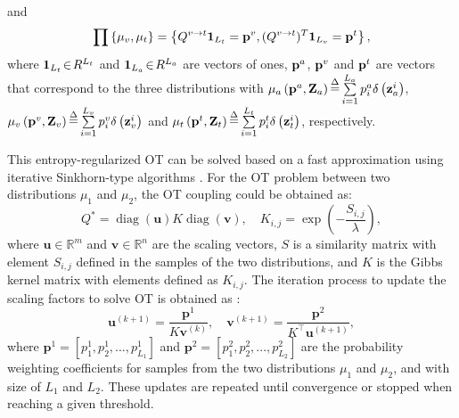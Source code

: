 \documentclass[conference]{IEEEtran}
\begin{document}
and
\begin{equation}
	\prod {\left\{ {\mu_v ,\mu_t } \right\}} = \left\{ {Q^{v \to t} {\bf 1}_{L_t }  = \mathbf{p}^v ,(Q^{v \to t} )^T {\bf 1}_{L_v }  = \mathbf{p}^t } \right\},
\end{equation}  
where ${\bf 1}_{L_t } \! \in \! R^{L_t }$ and ${\bf 1}_{L_a } \!\in \! R^{L_a }$ are vectors of ones, ${\bf p}^a$, ${\bf p}^v$ and ${\bf p}^t$ are vectors that correspond to the three distributions with $\mu _a \left( {{\bf p}^a ,{\bf Z}_a } \right) \mathop  = \limits^\Delta \sum\limits_{i = 1}^{L_a } {p_i^a \delta \left( {{\bf z}_a^i } \right)} $, $\mu _v \left( {{\bf p}^v ,{\bf Z}_v } \right) \mathop  = \limits^\Delta \sum\limits_{i = 1}^{L_v } {p_i^v \delta \left( {{\bf z}_v^i } \right)} $ and $\mu _t \left( {{\bf p}^t ,{\bf Z}_t } \right) \mathop  = \limits^\Delta \sum\limits_{i = 1}^{L_t } {p_i^t \delta \left( {{\bf z}_t^i } \right)} $, respectively. 

This entropy-regularized OT can be solved based on a fast approximation using iterative Sinkhorn-type algorithms \cite{Cuturi2013}. For the OT problem between two distributions $\mu_1$ and $\mu_2$, the OT coupling could be obtained as:
\begin{equation}
	{Q}^* = \operatorname{diag}(\mathbf{u}) K \operatorname{diag}(\mathbf{v}), \quad K_{i,j} = \exp\left( - \frac{S_{i,j}}{\lambda} \right),
\end{equation}
where \( \mathbf{u} \in \mathbb{R}^m \) and \( \mathbf{v} \in \mathbb{R}^n \) are the scaling vectors, $S$ is a similarity matrix with element $S_{i, j}$ defined in the samples of the two distributions, and $K$ is the Gibbs kernel matrix with elements defined as $K_{i,j}$.
The iteration process to update the scaling factors to solve OT is obtained as \cite{Cuturi2013, PeyreBook2019}:
\begin{equation}
		\mathbf{u}^{(k+1)} =  \frac{\mathbf{p}^1}{K \mathbf{v}^{(k)}} , \quad
		\mathbf{v}^{(k+1)} = \frac{\mathbf{p}^2}{K^\top \mathbf{u}^{(k+1)}},
	\label{eq:scaling}
\end{equation}
where ${\mathbf {p}^1} = \left[ {p_1^1 ,p_2^1 ,...,p_{L_1 }^1 } \right]$ and ${\mathbf {p}^2} = \left[ {p_1^2 ,p_2^2 ,...,p_{L_2 }^2 } \right]$ are the probability weighting coefficients for samples from the two distributions $\mu_1$ and $\mu_2$, and with size of ${L_1 }$ and ${L_2}$. These updates are repeated until convergence or stopped when reaching a given threshold. 
\end{document}
